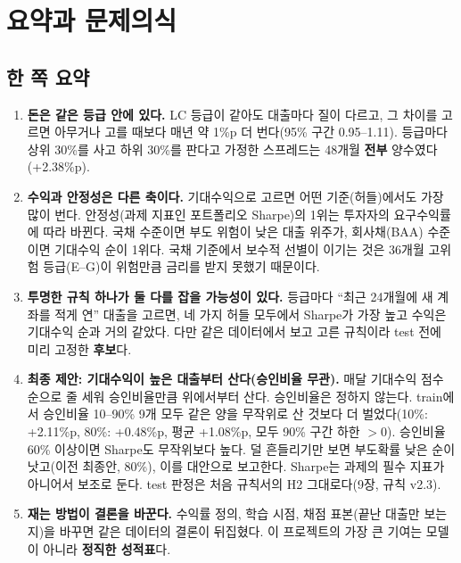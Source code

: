 \chapter*{요약과 문제의식}

\section*{한 쪽 요약}
\begin{keybox}[결론]
\begin{enumerate}[leftmargin=*]
\item \textbf{돈은 같은 등급 안에 있다.} LC 등급이 같아도 대출마다 질이 다르고, 그 차이를 고르면 아무거나 고를 때보다 매년 약 1\%p 더 번다(95\% 구간 0.95--1.11). 등급마다 상위 30\%를 사고 하위 30\%를 판다고 가정한 스프레드는 48개월 \textbf{전부} 양수였다(+2.38\%p).
\item \textbf{수익과 안정성은 다른 축이다.} 기대수익으로 고르면 어떤 기준(허들)에서도 가장 많이 번다. 안정성(과제 지표인 포트폴리오 Sharpe)의 1위는 투자자의 요구수익률에 따라 바뀐다. 국채 수준이면 부도 위험이 낮은 대출 위주가, 회사채(BAA) 수준이면 기대수익 순이 1위다. 국채 기준에서 보수적 선별이 이기는 것은 36개월 고위험 등급(E--G)이 위험만큼 금리를 받지 못했기 때문이다.
\item \textbf{투명한 규칙 하나가 둘 다를 잡을 가능성이 있다.} 등급마다 ``최근 24개월에 새 계좌를 적게 연'' 대출을 고르면, 네 가지 허들 모두에서 Sharpe가 가장 높고 수익은 기대수익 순과 거의 같았다. 다만 같은 데이터에서 보고 고른 규칙이라 test 전에 미리 고정한 \textbf{후보}다.
\item \textbf{최종 제안: 기대수익이 높은 대출부터 산다(승인비율 무관).} 매달 기대수익 점수 순으로 줄 세워 승인비율만큼 위에서부터 산다. 승인비율은 정하지 않는다. train에서 승인비율 10--90\% 9개 모두 같은 양을 무작위로 산 것보다 더 벌었다(10\%: +2.11\%p, 80\%: +0.48\%p, 평균 +1.08\%p, 모두 90\% 구간 하한 $>0$). 승인비율 60\% 이상이면 Sharpe도 무작위보다 높다. 덜 흔들리기만 보면 부도확률 낮은 순이 낫고(이전 최종안, 80\%), 이를 대안으로 보고한다. Sharpe는 과제의 필수 지표가 아니어서 보조로 둔다. test 판정은 처음 규칙서의 H2 그대로다(9장, 규칙 v2.3).
\item \textbf{재는 방법이 결론을 바꾼다.} 수익률 정의, 학습 시점, 채점 표본(끝난 대출만 보는지)을 바꾸면 같은 데이터의 결론이 뒤집혔다. 이 프로젝트의 가장 큰 기여는 모델이 아니라 \textbf{정직한 성적표}다.
\end{enumerate}
\end{keybox}


